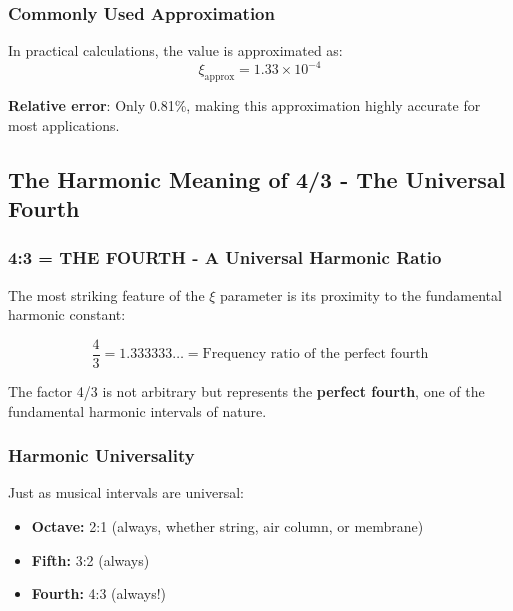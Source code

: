 	\subsubsection{Commonly Used Approximation}
	\label{subsubsec:approximation}
	
	In practical calculations, the value is approximated as:
	\begin{equation}
		\xi_{\text{approx}} = 1.33 \times 10^{-4}
		\label{eq:xi_approx}
	\end{equation}
	
	\textbf{Relative error}: Only 0.81\%, making this approximation highly accurate for most applications.
	
	\subsection{The Harmonic Meaning of 4/3 - The Universal Fourth}
	\label{subsec:four_thirds_proximity}
	
	\subsubsection{4:3 = THE FOURTH - A Universal Harmonic Ratio}
	\label{subsubsec:four_thirds_connection}
	
	The most striking feature of the $\xi$ parameter is its proximity to the fundamental harmonic constant:
	
	\begin{equation}
		\frac{4}{3} = 1.333333\ldots = \text{Frequency ratio of the perfect fourth}
		\label{eq:four_thirds}
	\end{equation}
	
	The factor 4/3 is not arbitrary but represents the \textbf{perfect fourth}, one of the fundamental harmonic intervals of nature.
	
	\subsubsection{Harmonic Universality}
	\label{subsubsec:harmonic_universality}
	
	Just as musical intervals are universal:
	\begin{itemize}
		\item \textbf{Octave:} 2:1 (always, whether string, air column, or membrane)
		\item \textbf{Fifth:} 3:2 (always)
		\item \textbf{Fourth:} 4:3 (always!)
	\end{itemize}
	
